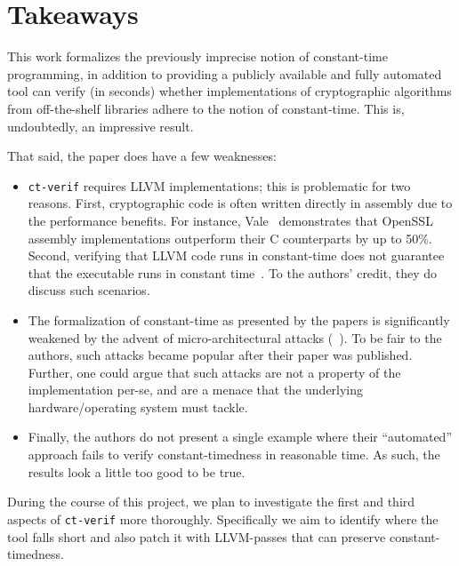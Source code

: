 \section{Takeaways}

This work formalizes the previously imprecise notion of constant-time programming, in addition to providing a publicly available and fully automated tool can verify (in seconds) whether implementations of cryptographic algorithms from off-the-shelf libraries adhere to the notion of constant-time. 
This is, undoubtedly, an impressive result.

That said, the paper does have a few weaknesses:
\begin{itemize}
	\item \texttt{ct-verif} requires LLVM implementations; this is problematic for two reasons.
	First, cryptographic code is often written directly in assembly due to the performance benefits. For instance, Vale~\cite{vale} demonstrates that OpenSSL assembly implementations outperform their C counterparts by up to 50\%.
	Second, verifying that LLVM code runs in constant-time does not guarantee that the executable runs in constant time~\cite{KaufmannPVV16}. To the authors' credit, they do discuss such scenarios.
	\item The formalization of constant-time as presented by the papers is significantly weakened by the advent of micro-architectural attacks (~\cite{meltdown,spectre}). To be fair to the authors, such attacks became popular after their paper was published. Further, one could argue that such attacks are not a property of the implementation per-se, and are a menace that the underlying hardware/operating system must tackle.
	\item Finally, the authors do not present a single example where their ``automated'' approach fails to verify constant-timedness in reasonable time. As such, the results look a little too good to be true. 
\end{itemize}

During the course of this project, we plan to investigate the first and third aspects of \texttt{ct-verif} more thoroughly. 
Specifically we aim to identify where the tool falls short and also patch it with LLVM-passes that can preserve constant-timedness. 